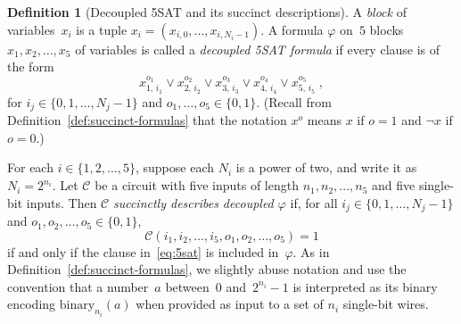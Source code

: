 \documentclass[11pt]{article}
\theoremstyle{definition}
\newtheorem{definition}[theorem]{Definition}
\newcommand{\circuit}{\mathcal{C}}
\newcommand{\binary}[1]{\mathrm{binary}_{#1}}
\begin{document}
\begin{definition}[Decoupled 5SAT and its succinct descriptions]
  A \emph{block} of variables~$x_i$ is a tuple $x_i = (x_{i,0}, \ldots, x_{i,
    N_i-1})$.
  A formula $\varphi$ on~$5$ blocks $x_1, x_2, \ldots, x_5$ of variables is
  called a \emph{decoupled 5SAT formula} if every clause is of the form
  \begin{equation}\label{eq:5sat}
    x_{1,\, i_1}^{o_1}
    \lor x_{2,\, i_2}^{o_2}
    \lor x_{3,\, i_3}^{o_3}
    \lor x_{4,\, i_4}^{o_4}
    \lor x_{5,\, i_5}^{o_5}\;,
  \end{equation}
  for $i_j \in \{0, 1, \ldots, N_j-1\}$ and $o_1, \ldots, o_5 \in \{0, 1\}$.
  (Recall from Definition~\ref{def:succinct-formulas} that the notation $x^{o}$
  means $x$ if $o = 1$ and $\neg x$ if $o = 0$.)

  For each $i\in\{1, 2, \ldots, 5\}$, suppose each $N_i$ is a power of two, and write
  it as $N_i = 2^{n_i}$.
  Let $\circuit$ be a circuit with five inputs of length $n_1, n_2, \ldots, n_5$ and
  five single-bit inputs.
  Then $\circuit$ \emph{succinctly describes decoupled $\varphi$} if, for all
  $i_j \in \{0, 1, \ldots, N_j-1\}$ and $o_1, o_2, \ldots, o_5 \in \{0, 1\}$,
  \begin{equation}\label{eq:put-in-numbers}
    \circuit(i_1, i_2, \ldots, i_5,
    o_1, o_2, \ldots, o_5) = 1
  \end{equation}
  if and only if the clause in~\eqref{eq:5sat} is included in~$\varphi$.
  As in Definition~\ref{def:succinct-formulas}, we slightly abuse notation and
  use the convention that a number~$a$ between~$0$ and~$2^{n_i}-1$ is
  interpreted as its binary encoding $\binary{n_i}(a)$ when provided as input to
  a set of $n_i$ single-bit wires.
\end{definition}
\end{document}
